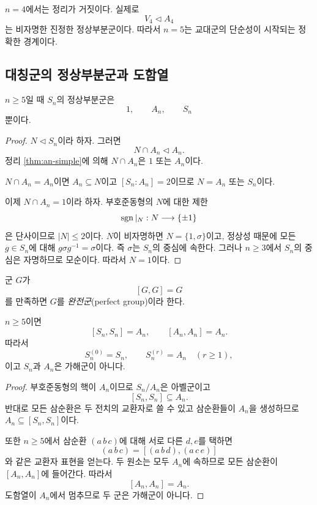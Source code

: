 \begin{remark}
$n=4$에서는 정리가 거짓이다. 실제로
\[
  V_4\triangleleft A_4
\]
는 비자명한 진정한 정상부분군이다. 따라서 $n=5$는 교대군의 단순성이 시작되는 정확한 경계이다.
\end{remark}

\subsection{대칭군의 정상부분군과 도함열}

\begin{theorem}
\label{thm:sn-normal-subgroups}
$n\ge5$일 때 $S_n$의 정상부분군은
\[
  1,\qquad A_n,\qquad S_n
\]
뿐이다.
\end{theorem}

\begin{proof}
$N\triangleleft S_n$이라 하자. 그러면
\[
  N\cap A_n\triangleleft A_n.
\]
정리 \ref{thm:an-simple}에 의해 $N\cap A_n$은 $1$ 또는 $A_n$이다.

$N\cap A_n=A_n$이면 $A_n\subseteq N$이고 $[S_n:A_n]=2$이므로 $N=A_n$ 또는 $S_n$이다.

이제 $N\cap A_n=1$이라 하자. 부호준동형의 $N$에 대한 제한
\[
  \operatorname{sgn}|_N:N\longrightarrow\{\pm1\}
\]
은 단사이므로 $|N|\le2$이다. $N$이 비자명하면 $N=\{1,\sigma\}$이고, 정상성 때문에 모든 $g\in S_n$에 대해 $g\sigma g^{-1}=\sigma$이다. 즉 $\sigma$는 $S_n$의 중심에 속한다. 그러나 $n\ge3$에서 $S_n$의 중심은 자명하므로 모순이다. 따라서 $N=1$이다.
\end{proof}

\begin{definition}[완전군]
군 $G$가
\[
  [G,G]=G
\]
를 만족하면 $G$를 \emph{완전군}(perfect group)이라 한다.
\end{definition}

\begin{proposition}
\label{prop:sn-an-derived-series}
$n\ge5$이면
\[
  [S_n,S_n]=A_n,
  \qquad
  [A_n,A_n]=A_n.
\]
따라서
\[
  S_n^{(0)}=S_n,
  \qquad
  S_n^{(r)}=A_n\quad(r\ge1),
\]
이고 $S_n$과 $A_n$은 가해군이 아니다.
\end{proposition}

\begin{proof}
부호준동형의 핵이 $A_n$이므로 $S_n/A_n$은 아벨군이고
\[
  [S_n,S_n]\subseteq A_n.
\]
반대로 모든 삼순환은 두 전치의 교환자로 쓸 수 있고 삼순환들이 $A_n$을 생성하므로 $A_n\subseteq[S_n,S_n]$이다.

또한 $n\ge5$에서 삼순환 $(a\,b\,c)$에 대해 서로 다른 $d,e$를 택하면
\[
  (a\,b\,c)
  =[(a\,b\,d),(a\,c\,e)]
\]
와 같은 교환자 표현을 얻는다. 두 원소는 모두 $A_n$에 속하므로 모든 삼순환이 $[A_n,A_n]$에 들어간다. 따라서
\[
  [A_n,A_n]=A_n.
\]
도함열이 $A_n$에서 멈추므로 두 군은 가해군이 아니다.
\end{proof}

